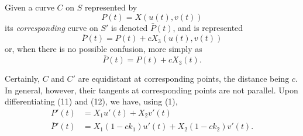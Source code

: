 \documentclass{book}
\begin{document}
Given a curve $C$ on $S$ represented by
\begin{equation}
P(t) = X(u(t), v(t))
\end{equation}
its \emph{corresponding} curve on $S'$ is denoted $\bar{P}(t)$, and is represented
\begin{equation*}
\bar{P}(t) = P(t) + cX_{3}(u(t), v(t))
\end{equation*}
or, when there is no possible confusion, more simply as
\begin{equation}
\bar{P}(t) = P(t) + cX_{3}(t).
\end{equation}

Certainly, $C$ and $C'$ are equidistant at corresponding points, the distance being $c$. In general, however, their tangents at corresponding points are not parallel. Upon differentiating (11) and (12), we have, using (1),
\begin{align}
      P'(t) & = X_{1}u'(t) + X_{2}v'(t) \\
\bar{P}'(t) & = X_{1} (1 - ck_{1}) u'(t) + X_{2} (1 - ck_{2}) v'(t).
\end{align}
\end{document}
